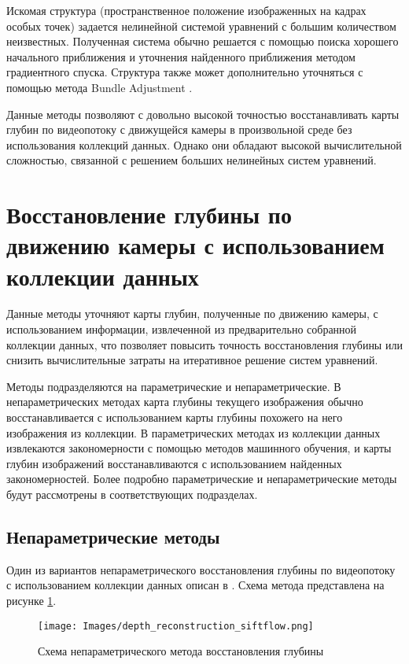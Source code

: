\documentclass{mipt-thesis-bs}
\begin{document}
Искомая структура (пространственное положение изображенных на кадрах особых точек) задается нелинейной системой уравнений с большим количеством неизвестных. Полученная система обычно решается с помощью поиска хорошего начального приближения и уточнения найденного приближения методом градиентного спуска. Структура также может дополнительно уточняться с помощью метода Bundle Adjustment \cite{zhang2006incremental}.

Данные методы позволяют с довольно высокой точностью восстанавливать карты глубин по видеопотоку с движущейся камеры в произвольной среде без использования коллекций данных. Однако они обладают высокой вычислительной сложностью, связанной с решением больших нелинейных систем уравнений.

\section{Восстановление глубины по движению камеры с использованием коллекции данных}
Данные методы уточняют карты глубин, полученные по движению камеры, с использованием информации, извлеченной из предварительно собранной коллекции данных, что позволяет повысить точность восстановления глубины или снизить вычислительные затраты на итеративное решение систем уравнений.

Методы подразделяются на параметрические и непараметрические. В непараметрических методах карта глубины текущего изображения обычно восстанавливается с использованием карты глубины похожего на него изображения из коллекции. В параметрических методах из коллекции данных извлекаются закономерности с помощью методов машинного обучения, и карты глубин изображений восстанавливаются с использованием найденных закономерностей. Более подробно параметрические и непараметрические методы будут рассмотрены в соответствующих подразделах.

\subsection{Непараметрические методы}
Один из вариантов непараметрического восстановления глубины по видеопотоку с использованием коллекции данных описан в \cite{karsch2014depth}. Схема метода представлена на рисунке \ref{figurenonparametric}.

\begin{figure}
	\centering
	\texttt{[image: Images/depth\_reconstruction\_siftflow.png]}
	\caption{Схема непараметрического метода восстановления глубины}
	\label{figurenonparametric}
\end{figure}
\end{document}
